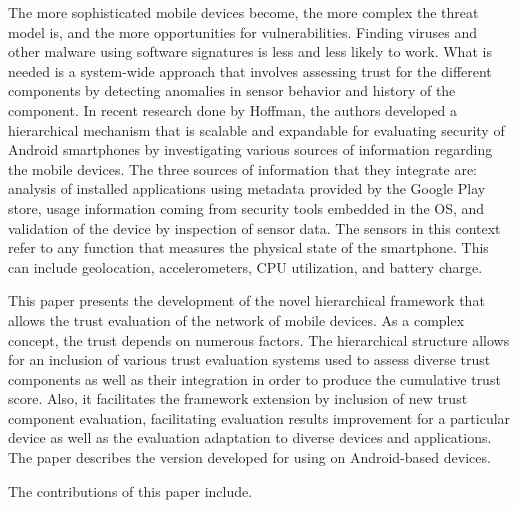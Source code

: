 The more sophisticated mobile devices become, the more complex the threat model is, and the more opportunities
for vulnerabilities.  Finding viruses and other malware using software signatures is less and less likely to
work.  What is needed is a system-wide  approach that involves assessing trust for the different
components by detecting anomalies in sensor behavior and history of the component.  
In recent research done by Hoffman,  the authors developed a hierarchical 
mechanism that is scalable and expandable for evaluating security of
Android smartphones by investigating various sources of information regarding 
the mobile devices. 
%
The three sources of information that they integrate are:
analysis of installed applications using metadata provided by the Google Play store,
usage information coming from security tools embedded in the OS, and 
validation of the device by inspection of sensor data.  
The sensors in this context refer to any function that
measures the physical state of the smartphone.  This can include geolocation, accelerometers, CPU 
utilization, and battery charge.


This paper presents the development of the novel hierarchical framework that allows the trust evaluation of the network of 
mobile devices. As a complex concept, the trust depends on numerous factors. The hierarchical structure allows for an 
inclusion of various trust evaluation systems used to assess diverse trust components as well as their integration in 
order to produce the cumulative trust score. Also, it facilitates the framework extension by inclusion of new trust 
component evaluation, facilitating evaluation results improvement for a particular device as well as the evaluation adaptation to diverse devices and applications. The paper describes the version developed for using on Android-based devices.

The contributions of this paper include. 
